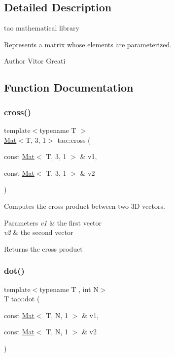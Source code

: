 \subsection{Detailed Description}
tao mathematical library 

Represents a matrix whose elements are parameterized.

\begin{DoxyAuthor}{Author}
Vitor Greati 
\end{DoxyAuthor}


\subsection{Function Documentation}
\mbox{\label{namespacetao_a0d5250c98322b01437ae6be0d9bd478d}} 
\subsubsection{\texorpdfstring{cross()}{cross()}}
{\footnotesize\ttfamily template$<$typename T $>$ \\
\mbox{\hyperlink{classtao_1_1_mat}{Mat}}$<$T, 3, 1$>$ tao\+::cross (\begin{DoxyParamCaption}\item[{const \mbox{\hyperlink{classtao_1_1_mat}{Mat}}$<$ T, 3, 1 $>$ \&}]{v1,  }\item[{const \mbox{\hyperlink{classtao_1_1_mat}{Mat}}$<$ T, 3, 1 $>$ \&}]{v2 }\end{DoxyParamCaption})}



Computes the cross product between two 3D vectors. 


\begin{DoxyParams}{Parameters}
{\em v1} & the first vector \\
\hline
{\em v2} & the second vector \\
\hline
\end{DoxyParams}
\begin{DoxyReturn}{Returns}
the cross product 
\end{DoxyReturn}
\mbox{\label{namespacetao_a01d099eba731722c912f651d0956dc42}} 
\subsubsection{\texorpdfstring{dot()}{dot()}}
{\footnotesize\ttfamily template$<$typename T , int N$>$ \\
T tao\+::dot (\begin{DoxyParamCaption}\item[{const \mbox{\hyperlink{classtao_1_1_mat}{Mat}}$<$ T, N, 1 $>$ \&}]{v1,  }\item[{const \mbox{\hyperlink{classtao_1_1_mat}{Mat}}$<$ T, N, 1 $>$ \&}]{v2 }\end{DoxyParamCaption})}



